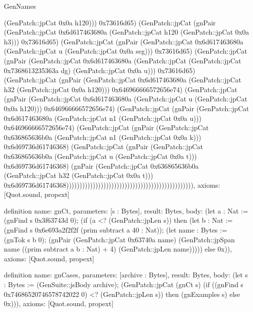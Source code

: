 \begin{lexlean}{GenNames}
\begin{semanticmodule}
{(GenPatch::jpCat 0x0a h120))) 0x73616d65) (GenPatch::jpCat (gnPair (GenPatch::jpCat 0x6d617463680a (GenPatch::jpCat h120 (GenPatch::jpCat 0x0a h3))) 0x73616d65) (GenPatch::jpCat (gnPair (GenPatch::jpCat 0x6d617463680a (GenPatch::jpCat u (GenPatch::jpCat 0x0a seg))) 0x73616d65) (GenPatch::jpCat (gnPair (GenPatch::jpCat 0x6d617463680a (GenPatch::jpCat (GenPatch::jpCat 0x7368613235363a dg) (GenPatch::jpCat 0x0a u))) 0x73616d65) (GenPatch::jpCat (gnPair (GenPatch::jpCat 0x6d617463680a (GenPatch::jpCat h32 (GenPatch::jpCat 0x0a h120))) 0x646966666572656e74) (GenPatch::jpCat (gnPair (GenPatch::jpCat 0x6d617463680a (GenPatch::jpCat u (GenPatch::jpCat 0x0a h120))) 0x646966666572656e74) (GenPatch::jpCat (gnPair (GenPatch::jpCat 0x6d617463680a (GenPatch::jpCat n1 (GenPatch::jpCat 0x0a u))) 0x646966666572656e74) (GenPatch::jpCat (gnPair (GenPatch::jpCat 0x636865636b0a (GenPatch::jpCat n1 (GenPatch::jpCat 0x0a k))) 0x6d69736d61746368) (GenPatch::jpCat (gnPair (GenPatch::jpCat 0x636865636b0a (GenPatch::jpCat u (GenPatch::jpCat 0x0a t))) 0x6d69736d61746368) (gnPair (GenPatch::jpCat 0x636865636b0a (GenPatch::jpCat h32 (GenPatch::jpCat 0x0a t))) 0x6d69736d61746368)))))))))))))))))))))))))))))))))))))))))))))))),
  axioms: [Quot.sound, propext]
}

definition{
  name: gnCt,
  parameters: [s : Bytes],
  result: Bytes,
  body: (let a : Nat := (gnFind s 0x3f63743d 0); (if (a <? (GenPatch::jpLen s)) then (let b : Nat := (gnFind s 0x6e693a2f2f2f (prim subtract a 40 : Nat)); (let name : Bytes := (gnTok s b 0); (gnPair (GenPatch::jpCat 0x63740a name) (GenPatch::jpSpan name ((prim subtract a b : Nat) + 4) (GenPatch::jpLen name))))) else 0x)),
  axioms: [Quot.sound, propext]
}

definition{
  name: gnCases,
  parameters: [archive : Bytes],
  result: Bytes,
  body: (let s : Bytes := (GenSuite::jsBody archive); (GenPatch::jpCat (gnCt s) (if ((gnFind s 0x74686520746578742022 0) <? (GenPatch::jpLen s)) then (gnExamples s) else 0x))),
  axioms: [Quot.sound, propext]
}
\end{semanticmodule}
\end{lexlean}

